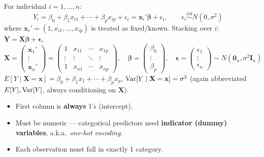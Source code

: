\begin{definition}
    For individual $i=1,\dots,n$:
    \[Y_i = \beta_0+\beta_1x_{i1}+\cdots+\beta_px_{ip}+\epsilon_i
    = \mathbf{x}_i'\boldsymbol\beta+\epsilon_i, \qquad \epsilon_i\overset{iid}\sim N(0,\sigma^2)\]
    where $\mathbf{x}_i'=(1,x_{i1},\dots,x_{ip})$ is treated as
    fixed/known. Stacking over $i$: $\boxed{\mathbf{Y}=\mathbf{X}\boldsymbol\beta+\boldsymbol\epsilon}$,
    \[\mathbf{X} = \begin{pmatrix}\mathbf{x}_1'\\\vdots\\\mathbf{x}_n'\end{pmatrix}
    = \begin{pmatrix}1&x_{11}&\cdots&x_{1p}\\\vdots&\vdots&\ddots&\vdots\\1&x_{n1}&\cdots&x_{np}\end{pmatrix},
    \quad \boldsymbol\beta=\begin{pmatrix}\beta_0\\\vdots\\\beta_p\end{pmatrix},
    \quad \boldsymbol\epsilon=\begin{pmatrix}\epsilon_1\\\vdots\\\epsilon_n\end{pmatrix}
    \sim N(\mathbf{0}_n,\sigma^2\mathbf{I}_n)\]
     $E[Y\mid\mathbf{X}=\mathbf{x}]=\beta_0+\beta_1x_1+\cdots+\beta_px_p$,
    $\operatorname{Var}[Y\mid\mathbf{X}=\mathbf{x}]=\sigma^2$ (again abbreviated
    $E[Y],\operatorname{Var}[Y]$, always conditioning on $\mathbf{X}$).
\end{definition}


\begin{remark}
    \begin{itemize}
        \item First column is \textbf{always} 1's (intercept).
        \item Must be numeric --- categorical predictors need
        \textbf{indicator (dummy) variables}, a.k.a.\ \emph{one-hot encoding}.
        \item Each observation must fall in exactly 1 category.
    \end{itemize}
\end{remark}

